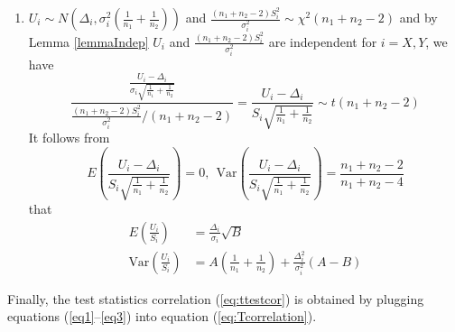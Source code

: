 \documentclass[12pt, a4paper]{article}
\newcommand{\var}{\text{Var}}
\begin{document}
\begin{enumerate}
		\item $U_i\sim N\left(\Delta_i, \sigma_i^2(\frac{1}{n_1} + \frac{1}{n_2})\right)$ and $\frac{(n_1 + n_2 -2)S_i^2}{\sigma_i^2} \sim
		\chi^2(n_1 + n_2-2)$ and by Lemma \ref{lemmaIndep}  $U_i$ and $\frac{(n_1 + n_2 -2)S_i^2}{\sigma_i^2}$ are independent for $i = X, Y$, we have 
		\begin{equation}
			\frac{\frac{U_i-\Delta_i}{\sigma_i\sqrt{\frac{1}{n_1} + \frac{1}{n_2}}}}{\frac{(n_1 + n_2-2)S_i^2}{\sigma_i^2}/(n_1 + n_2 -2)}  =
			\frac{U_i-\Delta_i}{S_i\sqrt{\frac{1}{n_1 } + \frac{1}{n_2}}}\sim t(n_1 + n_2-2)
		\end{equation}	
		It follows from 
		\begin{equation}
			E\left(\frac{U_i-\Delta_i}{S_i\sqrt{\frac{1}{n_1} + \frac{1}{n_2}}}\right)=0, ~~ \text{Var}\left(\frac{U_i-\Delta_i}{S_i\sqrt{\frac{1}{n_1} + \frac{1}{n_2}}}\right) = \frac{n_1 + n_2-2}{n_1 + n_2-4}
		\end{equation}
	 that
	 \begin{equation}\label{eq3}
	\begin{aligned}
	E\left(\frac{U_i}{S_i}\right) &= \frac{\Delta_i}{\sigma_i}\sqrt{B} \\
	\var\left(\frac{U_i}{S_i}\right)&=A\left(\frac{1}{n_1} + \frac{1}{n_2}\right) + \frac{\Delta_i^2}{\sigma_i^2}(A-B)
	\end{aligned}
	 \end{equation}
	\end{enumerate}
	Finally,  the test statistics correlation (\ref{eq:ttestcor}) is obtained by plugging
	equations (\ref{eq1}--\ref{eq3}) into equation (\ref{eq:Tcorrelation}).
	
\end{document}
